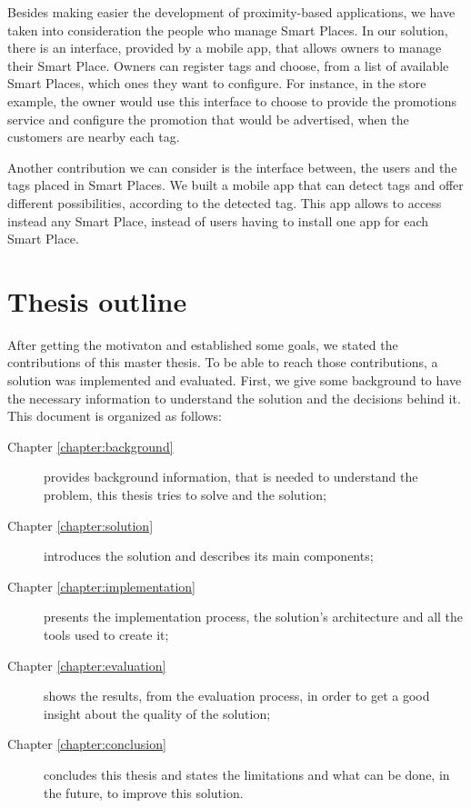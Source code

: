 Besides making easier the development of proximity-based applications, we have taken into consideration the people who manage Smart Places.
In our solution, there is an interface, provided by a mobile app, that allows owners to manage their Smart Place. Owners can register tags and choose, from a list of available Smart Places, which ones they want to configure.
For instance, in the store example, the owner would use this interface to choose to provide the promotions service and configure the promotion that would be advertised, when the customers are nearby each tag.

Another contribution we can consider is the interface between, the users and the tags placed in Smart Places.
We built a mobile app that can detect tags and offer different possibilities, according to the detected tag.
This app allows to access instead any Smart Place, instead of users having to install one app for each Smart Place.

\section{Thesis outline}
\label{sec:introduction_thesis_outline}
After getting the motivaton and established some goals, we stated the contributions of this master thesis.
To be able to reach those contributions, a solution was implemented and evaluated.
First, we give some background to have the necessary information to understand the solution and the decisions behind it.
This document is organized as follows:
\begin{description}
  \item[Chapter \ref{chapter:background}]
  provides background information, that is needed to understand the problem, this thesis tries to solve and the solution;
  \item[Chapter \ref{chapter:solution}]
  introduces the solution and describes its main components;
  \item[Chapter \ref{chapter:implementation}]
  presents the implementation process, the solution's architecture and all the tools used to create it;
  \item[Chapter \ref{chapter:evaluation}]
  shows the results, from the evaluation process, in order to get a good insight about the quality of the solution;
  \item[Chapter \ref{chapter:conclusion}]
  concludes this thesis and states the limitations and what can be done, in the future, to improve this solution.
\end{description}
